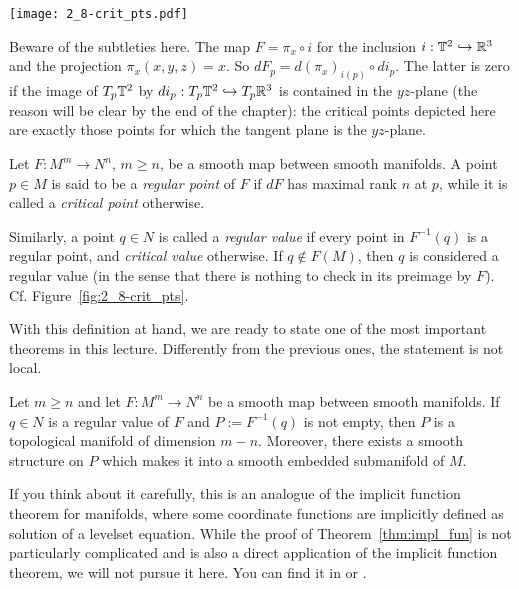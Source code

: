 \begin{marginfigure}
  \texttt{[image: 2\_8-crit\_pts.pdf]}
  \caption{Beware of the subtleties here. The map $F=\pi_x\circ i$ for the inclusion $i:\mathbb{T}^2\hookrightarrow\mathbb{R}^3$ and the projection $\pi_x(x,y,z)=x$.
    So $dF_p = d (\pi_x)_{i(p)} \circ d i_p$. The latter is zero if the image of $T_p\mathbb{T}^2$ by $d i_p: T_p\mathbb{T}^2\hookrightarrow T_p\mathbb{R}^3$ is contained in the $yz$-plane (the reason will be clear by the end of the chapter): the critical points depicted here are exactly those points for which the tangent plane is the $yz$-plane.}
  \label{fig:2_8-crit_pts}
\end{marginfigure}

\begin{definition}
  Let $F:M^m \to N^n$, $m\geq n$, be a smooth map between smooth manifolds.
  A point $p\in M$ is said to be a \emph{regular point} of $F$ if $dF$ has maximal rank $n$ at $p$, while it is called a \emph{critical point} otherwise.

  Similarly, a point $q\in N$ is called a \emph{regular value} if every point in $F^{-1}(q)$ is a regular point, and \emph{critical value} otherwise. If $q\not\in F(M)$, then $q$ is considered a regular value (in the sense that there is nothing to check in its preimage by $F$).
  Cf. Figure~\ref{fig:2_8-crit_pts}.
\end{definition}

With this definition at hand, we are ready to state one of the most important theorems in this lecture.
Differently from the previous ones, the statement is not local.

\begin{theorem}\label{thm:impl_fun}
  Let $m\geq n$ and let $F: M^m \to N^n$ be a smooth map between smooth manifolds.
  If $q\in N$ is a regular value of $F$ and $P := F^{-1}(q)$ is not empty, then $P$ is a topological manifold of dimension $m-n$.
  Moreover, there exists a smooth structure on $P$ which makes it into a smooth embedded submanifold of $M$.
\end{theorem}

If you think about it carefully, this is an analogue of the implicit function theorem for manifolds, where some coordinate functions are implicitly defined as solution of a levelset equation.
While the proof of Theorem~\ref{thm:impl_fun} is not particularly complicated and is also a direct application of the implicit function theorem, we will not pursue it here. You can find it in \cite[Theorem 5.12]{book:lee} or \cite[Theorem 9.9]{book:tu}.

